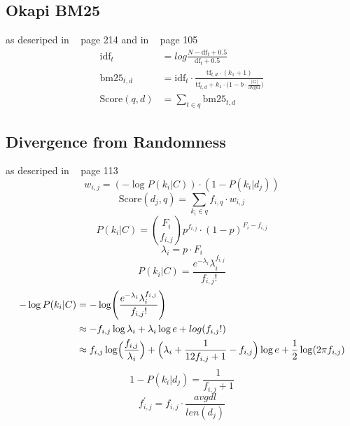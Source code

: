 \subsection{Okapi BM25}
\label{sec:okapi_bm25}
as descriped in ~\cite{manning2008} page 214 and in ~\cite{ModernInvormationRetrieval1999} page 105
\begin{equation}
  \begin{split}
    \text{idf}_t & = log \frac{N - \text{df}_t + 0.5}{\text{df}_t + 0.5} \\
    \text{bm25}_{t, d} & = \text{idf}_t \cdot \frac{\text{tf}_{t, d} \cdot (k_1 + 1)}{\text{tf}_{t, d} + k_1 \cdot \bigl(1 - b \cdot \frac{|G|}{\text{avgdl}}\bigr)}  \\
    \text{Score}(q, d) & = \sum_{t \in q}\text{bm25}_{t, d}
  \end{split}
\end{equation}

\subsection{Divergence from Randomness}
\label{sec:divergence_from_randomness}

as descriped in ~\cite{ModernInvormationRetrieval1999} page 113
\begin{equation}
  w_{i, j} = (- \log P(k_i | C)) \cdot (1 - P(k_i | d_j))
\end{equation}
\begin{equation}
  \text{Score}(d_j, q) = \sum_{k_i \in q} f_{i, q} \cdot w_{i, j}
\end{equation}
\begin{equation}
  P(k_i | C) = \binom{F_i}{f_{i, j}}p^{f_{i, j}} \cdot (1 - p)^{F_i - f_{i, j}}
\end{equation}
\begin{equation}
  \lambda_i = p \cdot F_i
\end{equation}
\begin{equation}
  P(k_i | C) = \frac{e^{-\lambda_i}\lambda_i^{f_{i, j}}}{f_{i, j}!}
\end{equation}
\begin{equation}
  \begin{split}
    - \log P(k_i | C) & = -\log\Biggl(\frac{e^{-\lambda_i}\lambda_i^{f_{i, j}}}{f_{i, j}!}\Biggr) \\
    & \approx -f_{i,j} \log \lambda_i + \lambda_i \log e + log(f_{i,j}!) \\
    & \approx f_{i, j} \log \Bigl( \frac{f_{i, j}}{\lambda_i} \Bigr) + \Bigl( \lambda_i + \frac{1}{12 f_{i, j} + 1} - f_{i, j}\Bigr) \log e + \frac{1}{2} \log(2 \pi f_{i, j})
  \end{split}
\end{equation}
\begin{equation}
  1 - P(k_i | d_j) = \frac{1}{f_{i, j} + 1}
\end{equation}
\begin{equation}
  f^{\prime}_{i, j} = f_{i, j} \cdot \frac{avgdl}{len(d_j)}
\end{equation}


